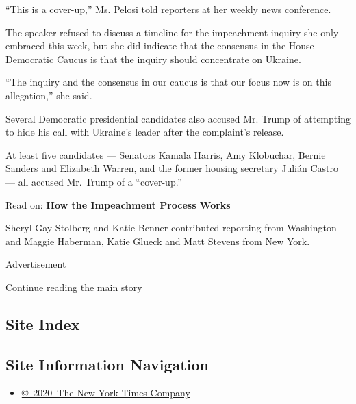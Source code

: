 ``This is a cover-up,'' Ms. Pelosi told reporters at her weekly news
conference.

The speaker refused to discuss a timeline for the impeachment inquiry
she only embraced this week, but she did indicate that the consensus in
the House Democratic Caucus is that the inquiry should concentrate on
Ukraine.

``The inquiry and the consensus in our caucus is that our focus now is
on this allegation,'' she said.

Several Democratic presidential candidates also accused Mr. Trump of
attempting to hide his call with Ukraine's leader after the complaint's
release.

At least five candidates --- Senators Kamala Harris, Amy Klobuchar,
Bernie Sanders and Elizabeth Warren, and the former housing secretary
Julián Castro --- all accused Mr. Trump of a ``cover-up.''

Read on:
\textbf{\href{https://www.nytimes.com/2019/09/24/us/politics/impeachment-trump-explained.html}{How
the Impeachment Process Works}}

Sheryl Gay Stolberg and Katie Benner contributed reporting from
Washington and Maggie Haberman, Katie Glueck and Matt Stevens from New
York.

Advertisement

\protect\hyperlink{after-bottom}{Continue reading the main story}

\hypertarget{site-index}{%
\subsection{Site Index}\label{site-index}}

\hypertarget{site-information-navigation}{%
\subsection{Site Information
Navigation}\label{site-information-navigation}}

\begin{itemize}
\tightlist
\item
  \href{https://help.nytimes.com/hc/en-us/articles/115014792127-Copyright-notice}{©~2020~The
  New York Times Company}
\end{itemize}

